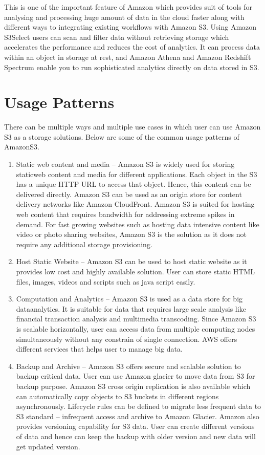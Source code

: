 This is one of the important feature of Amazon which provides suit of tools for
analysing and processing huge amount of data in the cloud faster along with
different ways to integrating existing workflows with Amazon S3. Using Amazon
S3Select users can scan and filter data without retrieving storage which
accelerates the performance and reduces the cost of analytics. It can process
data within an object in storage at rest, and Amazon Athena and Amazon Redshift
Spectrum enable you to run sophisticated analytics directly on data stored in
S3.




\section{Usage Patterns}
There can be multiple ways and multiple use cases in which user can use Amazon
S3 as a storage solutions. Below are some of the common usage patterns of
AmazonS3.
\begin{enumerate}
\item Static web content and media – Amazon S3 is widely used for storing
staticweb content and media for different applications. Each object in the S3
has a
unique HTTP URL to access that object. Hence, this content can be delivered
directly. Amazon S3 can be
used as an origin store for content delivery networks like Amazon CloudFront.
Amazon S3 is suited for hosting web content that requires bandwidth for
addressing extreme spikes in demand. For fast growing websites such as hosting
data intensive content like video or photo sharing websites, Amazon S3 is the
solution as it does not require any additional storage provisioning.
 
\item Host Static Website – Amazon S3 can be used to host static website as it
provides low cost and highly available solution. User can store static HTML
files, images, videos and scripts such as java script easily.

\item Computation and Analytics – Amazon S3 is used as a data store for big
dataanalytics. It is suitable for data that requires large scale analysis like
financial transaction analysis and multimedia transcoding. Since Amazon S3 is
scalable horizontally, user can access data from multiple computing nodes
simultaneously without any constrain of single connection. AWS offers different
services that helps user to manage big data.

\item Backup and Archive – Amazon S3 offers secure and scalable solution to
backup critical data. User can use Amazon glacier to move data from S3 for
backup purpose. Amazon S3 cross origin replication is also available which can
automatically copy objects to S3 buckets in different regions asynchronously.
Lifecycle rules can be defined to migrate less frequent data to S3 standard –
infrequent access and archive to Amazon Glacier. Amazon also provides
versioning capability for S3 data. User can create different versions of data
and hence can keep the backup with older version and new data will get updated
version.
\end{enumerate}

